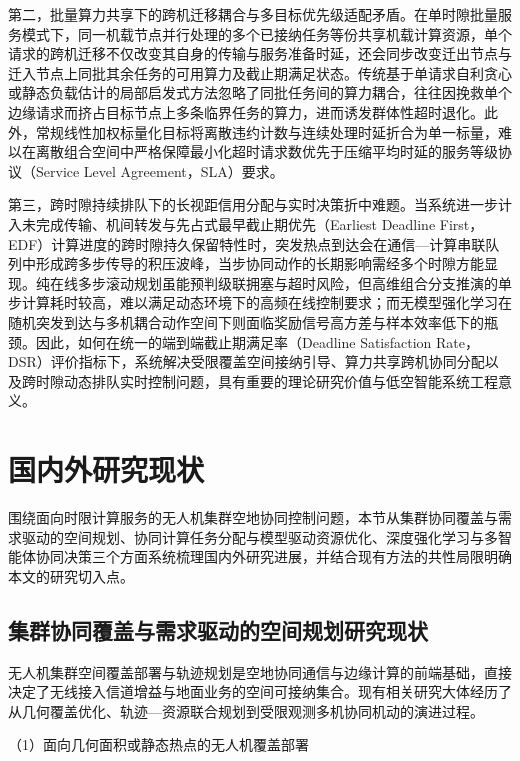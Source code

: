 第二，批量算力共享下的跨机迁移耦合与多目标优先级适配矛盾。在单时隙批量服务模式下，同一机载节点并行处理的多个已接纳任务等份共享机载计算资源，单个请求的跨机迁移不仅改变其自身的传输与服务准备时延，还会同步改变迁出节点与迁入节点上同批其余任务的可用算力及截止期满足状态。传统基于单请求自利贪心或静态负载估计的局部启发式方法忽略了同批任务间的算力耦合，往往因挽救单个边缘请求而挤占目标节点上多条临界任务的算力，进而诱发群体性超时退化。此外，常规线性加权标量化目标将离散违约计数与连续处理时延折合为单一标量，难以在离散组合空间中严格保障最小化超时请求数优先于压缩平均时延的服务等级协议（Service Level Agreement，SLA）要求。

第三，跨时隙持续排队下的长视距信用分配与实时决策折中难题。当系统进一步计入未完成传输、机间转发与先占式最早截止期优先（Earliest Deadline First，EDF）计算进度的跨时隙持久保留特性时，突发热点到达会在通信—计算串联队列中形成跨多步传导的积压波峰，当步协同动作的长期影响需经多个时隙方能显现。纯在线多步滚动规划虽能预判级联拥塞与超时风险，但高维组合分支推演的单步计算耗时较高，难以满足动态环境下的高频在线控制要求；而无模型强化学习在随机突发到达与多机耦合动作空间下则面临奖励信号高方差与样本效率低下的瓶颈。因此，如何在统一的端到端截止期满足率（Deadline Satisfaction Rate，DSR）评价指标下，系统解决受限覆盖空间接纳引导、算力共享跨机协同分配以及跨时隙动态排队实时控制问题，具有重要的理论研究价值与低空智能系统工程意义。

\section{国内外研究现状}
\label{sec:related_work}

围绕面向时限计算服务的无人机集群空地协同控制问题，本节从集群协同覆盖与需求驱动的空间规划、协同计算任务分配与模型驱动资源优化、深度强化学习与多智能体协同决策三个方面系统梳理国内外研究进展，并结合现有方法的共性局限明确本文的研究切入点。

\subsection{集群协同覆盖与需求驱动的空间规划研究现状}
\label{sec:ch1-swarm-coverage}

无人机集群空间覆盖部署与轨迹规划是空地协同通信与边缘计算的前端基础，直接决定了无线接入信道增益与地面业务的空间可接纳集合\cite{chung2018swarm,zeng2016wireless,mozaffari2019tutorial}。现有相关研究大体经历了从几何覆盖优化、轨迹—资源联合规划到受限观测多机协同机动的演进过程。

（1）面向几何面积或静态热点的无人机覆盖部署


